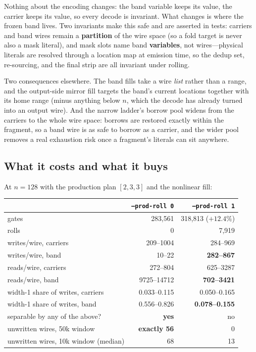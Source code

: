\documentclass[11pt]{article}
\begin{document}
Nothing about the encoding changes: the band variable keeps its value, the
carrier keeps its value, so every decode is invariant. What changes is where the
frozen band lives. Two invariants make this safe and are asserted in tests:
carriers and band wires remain a \textbf{partition} of the wire space (so a fold
target is never also a mask literal), and mask slots name band
\textbf{variables}, not wires---physical literals are resolved through a
location map at emission time, so the dedup set, re-sourcing, and the final
strip are all invariant under rolling.

Two consequences elsewhere. The band fills take a wire \emph{list} rather than a
range, and the output-side mirror fill targets the band's current locations
together with its home range (minus anything below $n$, which the decode has
already turned into an output wire). And the narrow ladder's borrow pool widens
from the carriers to the whole wire space: borrows are restored exactly within
the fragment, so a band wire is as safe to borrow as a carrier, and the wider
pool removes a real exhaustion risk once a fragment's literals can sit anywhere.

\subsection{What it costs and what it buys}

At $n{=}128$ with the production plan $[2,3,3]$ and the nonlinear fill:

\begin{center}
\begin{tabular}{lrr}
\toprule
 & \texttt{--prod-roll 0} & \texttt{--prod-roll 1} \\
\midrule
gates & 283{,}561 & 318{,}813 ($+12.4\%$) \\
rolls & 0 & 7{,}919 \\
writes/wire, carriers & 209--1004 & 284--969 \\
writes/wire, band & 10--22 & \textbf{282--867} \\
reads/wire, carriers & 272--804 & 625--3287 \\
reads/wire, band & 9725--14712 & \textbf{702--3421} \\
width-1 share of writes, carriers & 0.033--0.115 & 0.050--0.165 \\
width-1 share of writes, band & 0.556--0.826 & \textbf{0.078--0.155} \\
separable by any of the above? & \textbf{yes} & no \\
unwritten wires, 50k window & \textbf{exactly 56} & 0 \\
unwritten wires, 10k window (median) & 68 & 13 \\
\bottomrule
\end{tabular}
\end{center}
\end{document}
